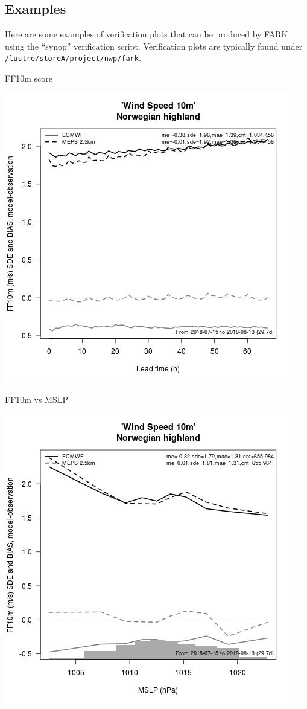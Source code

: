 \documentclass[letterpaper,10pt,twoside,twocolumn,openany]{book}
\begin{document}
{\subsection{Examples}
Here are some examples of verification plots that can be produced by FARK using the ``synop'' verification script. Verification plots are typically found under \lstinline!/lustre/storeA/project/nwp/fark!.

\begin{paperbox}{FF10m score}
  \centerline{\includegraphics[width=0.8\columnwidth]{ff10m_score_hl.jpg}}
\end{paperbox}

\begin{paperbox}{FF10m vs MSLP}
  \centerline{\includegraphics[width=0.8\columnwidth]{ff10m_mslp_hl.jpg}}
\end{paperbox}

}
\end{document}
